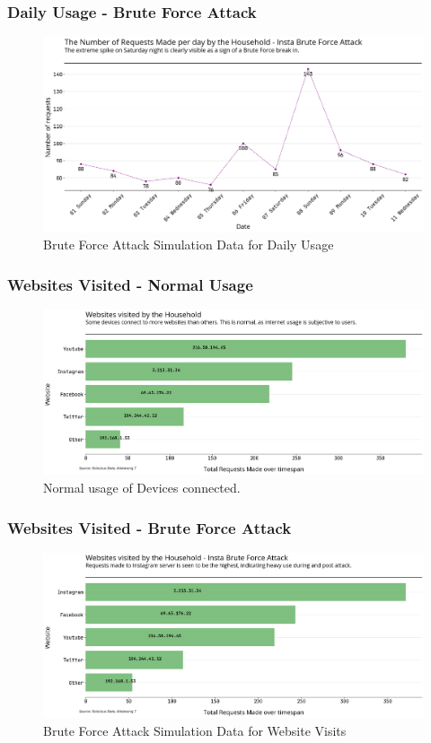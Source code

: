 \documentclass[11pt]{article}
\begin{document}
\subsubsection{Daily Usage - Brute Force Attack}
\begin{figure}[H]
    \centering
    \includegraphics[width=.95\textwidth]{router_log_analysis_graphs/insta_requests_per_day.png}
    \caption{Brute Force Attack Simulation Data for Daily Usage}
\end{figure}

\subsubsection{Websites Visited - Normal Usage}
\begin{figure}[H]
    \centering
    \includegraphics[width=.95\textwidth]{router_log_analysis_graphs/normal_website_visits.png}
    \caption{Normal usage of Devices connected. }
\end{figure}


\subsubsection{Websites Visited - Brute Force Attack}
\begin{figure}[H]
    \centering
    \includegraphics[width=.95\textwidth]{router_log_analysis_graphs/insta_website_visits.png}
    \caption{Brute Force Attack Simulation Data for Website Visits}
\end{figure}
\end{document}
